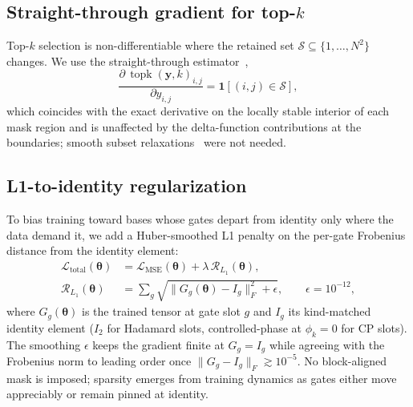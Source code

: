 \documentclass[a4paper, twocolumn]{quantumarticle}
\newcommand{\LL}{\mathcal{L}}
\newcommand{\topk}{\operatorname{topk}}
\begin{document}
\subsection{Straight-through gradient for top-$k$}
\label{sec:topk_grad}

Top-$k$ selection is non-differentiable where the retained set $\mathcal{S} \subseteq \{1, \dots, N^2\}$ changes. We use the straight-through estimator~\cite{bengio2013estimating},
\begin{equation}
  \frac{\partial\, \topk(\mathbf{y}, k)_{i,j}}{\partial y_{i,j}} = \mathbf{1}[(i,j) \in \mathcal{S}],
  \label{eq:ste}
\end{equation}
which coincides with the exact derivative on the locally stable interior of each mask region and is unaffected by the delta-function contributions at the boundaries; smooth subset relaxations~\cite{jang2017categorical, xie2019reparameterizable} were not needed.

\subsection{L1-to-identity regularization}
\label{sec:l1_reg}

To bias training toward bases whose gates depart from identity only where the data demand it, we add a Huber-smoothed L1 penalty on the per-gate Frobenius distance from the identity element:
\begin{align}
  \LL_{\text{total}}(\boldsymbol{\theta})
    &= \LL_{\text{MSE}}(\boldsymbol{\theta}) + \lambda \, \mathcal{R}_{L_1}(\boldsymbol{\theta}),
    \label{eq:total_loss} \\
  \mathcal{R}_{L_1}(\boldsymbol{\theta})
    &= \sum_{g} \sqrt{\bigl\| G_g(\boldsymbol{\theta}) - I_g \bigr\|_F^2 + \epsilon},
    \qquad \epsilon = 10^{-12},
    \label{eq:l1_reg}
\end{align}
where $G_g(\boldsymbol{\theta})$ is the trained tensor at gate slot $g$ and $I_g$ its kind-matched identity element ($I_2$ for Hadamard slots, controlled-phase at $\phi_k = 0$ for CP slots). The smoothing $\epsilon$ keeps the gradient finite at $G_g = I_g$ while agreeing with the Frobenius norm to leading order once $\| G_g - I_g \|_F \gtrsim 10^{-5}$. No block-aligned mask is imposed; sparsity emerges from training dynamics as gates either move appreciably or remain pinned at identity.
\end{document}
